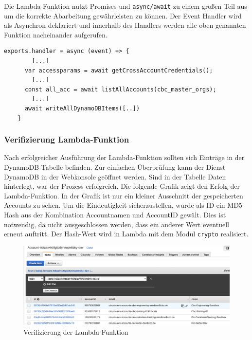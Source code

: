 Die Lambda-Funktion nutzt Promises und \verb+async/await+ zu einem großen Teil aus um die korrekte Abarbeitung gewährleisten zu können.
Der Event Handler wird als Asynchron deklariert und innerhalb des Handlers werden alle oben genannten Funktion nacheinander aufgerufen.

\begin{lstlisting}[basicstyle=\ttfamily\small, breaklines=true , frame = single, backgroundcolor=\color{lightgray}, caption={Beispiel zum asynchronen Funktionsaufruf (Datei: \textit{\nameref{lst:LambdaCode}})} ]
    exports.handler = async (event) => {
        [...]
      var accessparams = await getCrossAccountCredentials();
        [...]
      const all_acc = await listAllAccounts(cbc_master_orgs);
        [...]
      await writeAllDynamoDBItems([..])
    }
    \end{lstlisting}

\subsubsection{Verifizierung Lambda-Funktion}

Nach erfolgreicher Ausführung der Lambda-Funktion sollten sich Einträge in der DynamoDB-Tabelle befinden.
Zur einfachen Überprüfung kann der Dienst DynamoDB in der Webkonsole geöffnet werden.
Sind in der Tabelle Daten hinterlegt, war der Prozess erfolgreich.
Die folgende Grafik zeigt den Erfolg der Lambda-Funktion.
In der Grafik ist nur ein kleiner Ausschnitt der gespeicherten Accounts zu sehen.
Um die Eindeutigkeit sicherzustellen, wurde als ID ein MD5-Hash aus der Kombination Accountnamen und AccountID gewält.
Dies ist notwendig, da nicht ausgeschlossen werden, dass ein anderer Wert eventuell erneut auftritt.
Der Hash-Wert wird in Lambda mit dem Modul \verb+crypto+ realisiert.

\begin{figure}[htbp]
    \centering
    \includegraphics[width=1.0\textwidth]{50-Implementierung/DynamoWeb.png}
    \caption{Verifizierung der Lambda-Funktion}
    \label{fig:meine-grafik}
\end{figure}


